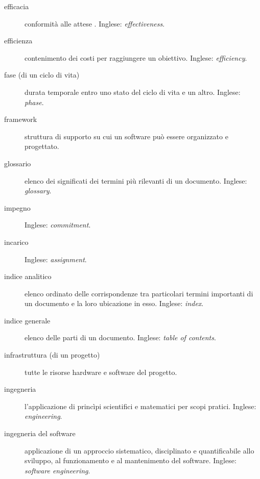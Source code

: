 \documentclass[a4paper]{article}
\begin{document}
\begin{description}
	\item[efficacia] 

			conformità alle attese	. Inglese: \emph{effectiveness}.
			
	\item[efficienza] 

			contenimento dei costi per raggiungere un obiettivo. Inglese: \emph{efficiency}.
			
	\item[fase (di un ciclo di vita)] 

			durata temporale entro uno stato del ciclo di vita e un altro. Inglese: \emph{phase}.
			
	\item[framework] 

			struttura di supporto su cui un software può essere organizzato e progettato.
			
	\item[glossario] 

			elenco dei significati dei termini più rilevanti di un documento. Inglese: \emph{glossary}.
			
	\item[impegno] 

			 Inglese: \emph{commitment}.
			
	\item[incarico] 

			 Inglese: \emph{assignment}.
			
	\item[indice analitico] 

			elenco ordinato delle corrispondenze tra particolari termini importanti di un documento e la loro ubicazione in esso. Inglese: \emph{index}.
			
	\item[indice generale] 

			elenco delle parti di un documento. Inglese: \emph{table of contents}.
			
	\item[infrastruttura (di un progetto)] 

			tutte le risorse hardware e software del progetto.
			
	\item[ingegneria] 

			l'applicazione di princìpi scientifici e matematici per scopi pratici. Inglese: \emph{engineering}.
			
	\item[ingegneria del software] 

			applicazione di un approccio sistematico, disciplinato e quantificabile allo sviluppo, al funzionamento e al mantenimento del software. Inglese: \emph{software engineering}.
			

\end{description}
\end{document}
